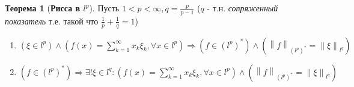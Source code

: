 \documentclass[12pt,a4paper]{article}
\theoremstyle{definition}
\newtheorem{theorem}{Теорема}
\newcommand{\norm}[1]{\left\lVert#1\right\rVert}
\newcommand{\conj}[1]{\left(#1\right)^*}
\begin{document}
\begin{theorem}[\textbf{Рисса в $l^p$}]
	Пусть $1 < p < \infty, q = \frac{p}{p-1}$ ($q$ - т.н. \textit{сопряженный показатель} т.е. такой что $\frac{1}{p} + \frac{1}{q} = 1$)
	
	\begin{enumerate}
		\item $(\xi \in l^p) \wedge \left(f(x) = \sum\limits_{k=1}^{\infty}{x_k \xi_k}, \forall x \in l^p\right) \Rightarrow
		(f \in \conj{l^p}) \wedge \left(\norm{f}_{\conj{l^p}} = \norm{\xi}_{l^q}\right)$
		\item $(f \in \conj{l^p}) \Rightarrow 
		\exists!\xi\in l^q: (f(x) = \sum\limits_{k=1}^{\infty}{x_k \xi_k}, \forall x \in l^p) \wedge \left(\norm{f}_{\conj{l^p}} = \norm{\xi}_{l^q}\right)$
	\end{enumerate}
\end{theorem}
\end{document}
